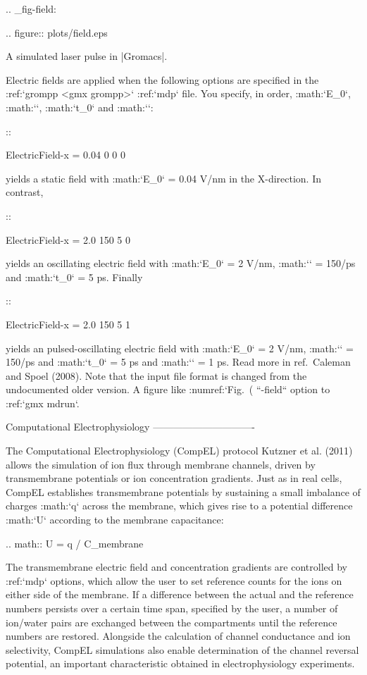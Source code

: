 .. _fig-field:

.. figure:: plots/field.eps

   A simulated laser pulse in |Gromacs|.

Electric fields are applied when the following options are specified in
the :ref:`grompp <gmx grompp>` :ref:`mdp` file. You specify, in order, :math:`E_0`,
:math:`\omega`, :math:`t_0` and :math:`\sigma`:

::

    ElectricField-x = 0.04 0       0     0

yields a static field with :math:`E_0` = 0.04 V/nm in the X-direction.
In contrast,

::

    ElectricField-x = 2.0  150     5     0

yields an oscillating electric field with :math:`E_0` = 2 V/nm,
:math:`\omega` = 150/ps and :math:`t_0` = 5 ps. Finally

::

    ElectricField-x = 2.0  150     5     1

yields an pulsed-oscillating electric field with :math:`E_0` = 2 V/nm,
:math:`\omega` = 150/ps and :math:`t_0` = 5 ps and :math:`\sigma` = 1
ps. Read more in ref. Caleman and Spoel (2008). Note that the input file
format is changed from the undocumented older version. A figure like
:numref:`Fig. (%
``-field`` option to :ref:`gmx mdrun`.

Computational Electrophysiology
-------------------------------

The Computational Electrophysiology (CompEL) protocol Kutzner et al.
(2011) allows the simulation of ion flux through membrane channels,
driven by transmembrane potentials or ion concentration gradients. Just
as in real cells, CompEL establishes transmembrane potentials by
sustaining a small imbalance of charges :math:`\Delta q` across the
membrane, which gives rise to a potential difference :math:`\Delta U`
according to the membrane capacitance:

.. math:: \Delta U = \Delta q / C_{membrane}

The transmembrane electric field and concentration gradients are
controlled by :ref:`mdp` options, which allow the user to set
reference counts for the ions on either side of the membrane. If a
difference between the actual and the reference numbers persists over a
certain time span, specified by the user, a number of ion/water pairs
are exchanged between the compartments until the reference numbers are
restored. Alongside the calculation of channel conductance and ion
selectivity, CompEL simulations also enable determination of the channel
reversal potential, an important characteristic obtained in
electrophysiology experiments.

